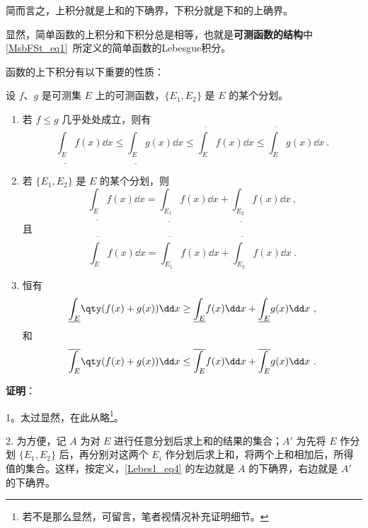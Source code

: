 简而言之，上积分就是上和的下确界，下积分就是下和的上确界。

显然，简单函数的上积分和下积分总是相等，也就是\textbf{可测函数的结构}中\autoref{MsbFSt_eq1}~所定义的简单函数的Lebesgue积分。

函数的上下积分有以下重要的性质：

\begin{theorem}{}\label{Lebes1_the1}

设 $f$、$g$ 是可测集 $E$ 上的可测函数，$\{E_1, E_2\}$ 是 $E$ 的某个分划。

\begin{enumerate}
  \item 若 $f\leq g$ 几乎处处成立，则有
  \begin{equation}
  \underline{\int_E} f(x) \dd x \leq \underline{\int_E} g(x) \dd x \leq \overline{\int_E} f(x) \dd x \leq \overline{\int_E} g(x) \dd x~.
  \end{equation}
  \item 若 $\{E_1, E_2\}$ 是 $E$ 的某个分划，则
  \begin{equation}\label{Lebes1_eq1}
  \underline{\int_E} f(x) \dd x=\underline{\int_{E_1}} f(x) \dd x+\underline{\int_{E_2}} f(x) \dd x~,
  \end{equation}
  且
  \begin{equation}\label{Lebes1_eq4}
  \overline{\int_E} f(x) \dd x=\overline{\int_{E_1}} f(x) \dd x+\overline{\int_{E_2}} f(x) \dd x~.
  \end{equation}
  \item 恒有
  \begin{equation}\label{Lebes1_eq5}
  \underline{\int_E} \qty(f(x)+g(x)) \dd x \geq \underline{\int_E} f(x) \dd x+\underline{\int_E} g(x) \dd x~,
  \end{equation}
  和
  \begin{equation}\label{Lebes1_eq6}
  \overline{\int_E} \qty(f(x)+g(x)) \dd x \leq \overline{\int_E} f(x) \dd x+\overline{\int_E} g(x) \dd x~.
  \end{equation}
\end{enumerate}



\end{theorem}

\textbf{证明}：

1。太过显然，在此从略\footnote{若不是那么显然，可留言，笔者视情况补充证明细节。}。

2. 为方便，记 $A$ 为对 $E$ 进行任意分划后求上和的结果的集合；$A'$ 为先将 $E$ 作分划 $\{E_1, E_2\}$ 后，再分别对这两个 $E_i$ 作分划后求上和，将两个上和相加后，所得值的集合。这样，按定义，\autoref{Lebes1_eq4} 的左边就是 $A$ 的下确界，右边就是 $A'$ 的下确界。

